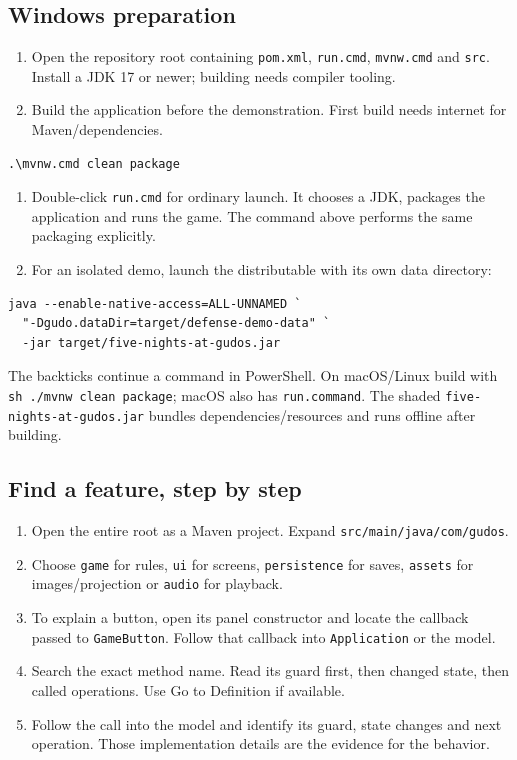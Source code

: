 \documentclass[11pt,a4paper]{article}
\newcommand{\code}[1]{\nolinkurl{#1}}
\begin{document}
\subsection*{Windows preparation}
\begin{enumerate}
\item Open the repository root containing \code{pom.xml}, \code{run.cmd}, \code{mvnw.cmd} and \code{src}. Install a JDK 17 or newer; building needs compiler tooling.
\item Build the application before the demonstration. First build needs internet for Maven/dependencies.
\end{enumerate}
\begin{lstlisting}[language={}]
.\mvnw.cmd clean package
\end{lstlisting}
\begin{enumerate}[resume]
\item Double-click \code{run.cmd} for ordinary launch. It chooses a JDK, packages the application and runs the game. The command above performs the same packaging explicitly.
\item For an isolated demo, launch the distributable with its own data directory:
\end{enumerate}
\begin{lstlisting}[language={}]
java --enable-native-access=ALL-UNNAMED `
  "-Dgudo.dataDir=target/defense-demo-data" `
  -jar target/five-nights-at-gudos.jar
\end{lstlisting}
The backticks continue a command in PowerShell. On macOS/Linux build with \code{sh ./mvnw clean package}; macOS also has \code{run.command}. The shaded \code{five-nights-at-gudos.jar} bundles dependencies/resources and runs offline after building.
\subsection*{Find a feature, step by step}
\begin{enumerate}
\item Open the entire root as a Maven project. Expand \code{src/main/java/com/gudos}.
\item Choose \code{game} for rules, \code{ui} for screens, \code{persistence} for saves, \code{assets} for images/projection or \code{audio} for playback.
\item To explain a button, open its panel constructor and locate the callback passed to \code{GameButton}. Follow that callback into \code{Application} or the model.
\item Search the exact method name. Read its guard first, then changed state, then called operations. Use Go to Definition if available.
\item Follow the call into the model and identify its guard, state changes and next operation. Those implementation details are the evidence for the behavior.
\end{enumerate}
\end{document}
